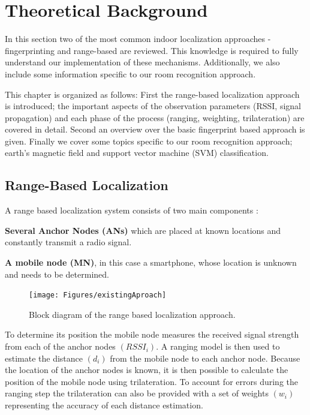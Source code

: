 
\chapter{Theoretical Background} %

\label{Chapter2} %

In this section two of the most common indoor localization approaches - fingerprinting and range-based are reviewed. This knowledge is required to fully understand our implementation of these mechanisms. Additionally, we also include some information specific to our room recognition approach.

This chapter is organized as follows: First the range-based localization approach is introduced; the important aspects of the observation parameters (RSSI, signal propagation) and each phase of the process (ranging, weighting, trilateration) are covered in detail. Second an overview over the basic fingerprint based approach is given. Finally we cover some topics specific to our room recognition approach; earth's magnetic field and support vector machine (SVM) classification.

\section{Range-Based Localization}
\label{therory:range-based}

A range based localization system consists of two main components \citep{surveyIndoorTechniques}:

\textbf{Several Anchor Nodes (ANs)} which are placed at known locations and constantly transmit a radio signal.

\textbf{A mobile node (MN)}, in this case a smartphone, whose location is unknown and needs to be determined.

\begin{figure}[ht]
\centering
\texttt{[image: Figures/existingAproach]}
\decoRule
\caption[Range-based localization approach]{Block diagram of the range based localization approach.}
\label{fig:existingApproach}
\end{figure}

To determine its position the mobile node measures the received signal strength from each of the anchor nodes $(RSSI_i)$. A ranging model is then used to estimate the distance $(d_i)$ from the mobile node to each anchor node. Because the location of the anchor nodes is known, it is then possible to calculate the position of the mobile node using trilateration. To account for errors during the ranging step the trilateration can also be provided with a set of weights $(w_i)$ representing the accuracy of each distance estimation.

